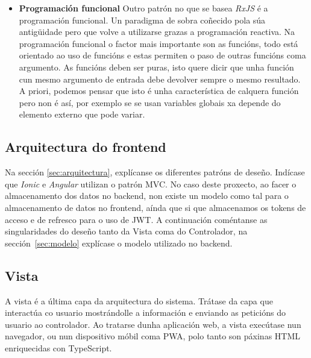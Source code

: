 \begin{itemize}
	\item \textbf{Programación funcional}\smallbreak
		Outro patrón no que se basea \textit{RxJS} é a programación funcional. Un paradigma de sobra coñecido pola súa antigüidade pero que volve a utilizarse grazas a programación reactiva. Na programación funcional o factor mais importante son as funcións, todo está orientado ao uso de funcións e estas permiten o paso de outras funcións coma argumento. As funcións deben ser puras, isto quere dicir que unha función cun mesmo argumento de entrada debe devolver sempre o mesmo resultado. A priori, podemos pensar que isto é unha característica de calquera función pero non é así, por exemplo se se usan variables globais xa depende do elemento externo que pode variar.
\end{itemize}

\subsection{Arquitectura do frontend}
Na sección \ref{sec:arquitectura}, explícanse os diferentes patróns de deseño. Indícase que \textit{Ionic} e \textit{Angular} utilizan o patrón \acrshort{MVC}. No caso deste proxecto, ao facer o almacenamento dos datos no backend, non existe un modelo como tal para o almacenamento de datos no frontend, aínda que si que almacenamos os tokens de acceso e de refresco para o uso de \acrshort{JWT}. A continuación coméntanse as singularidades do deseño tanto da Vista coma do Controlador, na sección~\ref{sec:modelo} explícase o modelo utilizado no backend.

\subsection{Vista}
A vista é a última capa da arquitectura do sistema. Trátase da capa que interactúa co usuario mostrándolle a información e enviando as peticións do usuario ao controlador. Ao tratarse dunha aplicación web, a vista execútase nun navegador, ou nun dispositivo móbil coma \acrshort{PWA}, polo tanto son páxinas \acrshort{HTML} enriquecidas con TypeScript.\bigbreak

